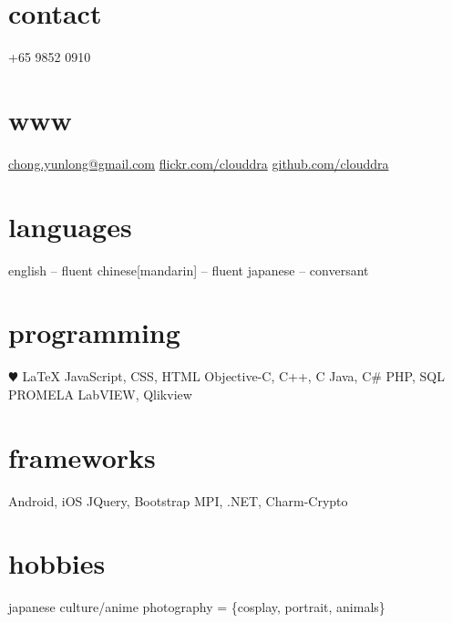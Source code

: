 \documentclass{friggeri-cv} %
\begin{document}


\begin{aside} %
\section{contact}
+65 9852 0910
~
\section{www}
\href{mailto:chong.yunlong@gmail.com}{chong.yunlong@gmail.com}
\href{https://secure.flickr.com/photos/clouddra/}{flickr.com/clouddra}
\href{https://github.com/clouddra}{github.com/clouddra}
~
\section{languages}
english -- fluent
chinese[mandarin] -- fluent
japanese -- conversant
~
\section{programming}
{\color{red} $\varheartsuit$} \LaTeX{}
JavaScript, CSS, HTML
Objective-C, C++, C 
Java, C\#
PHP, SQL
PROMELA 
LabVIEW, Qlikview
~
\section{frameworks}
Android, iOS
JQuery, Bootstrap
MPI, .NET, Charm-Crypto
~
\section{hobbies}
japanese culture/anime
photography = 
\{cosplay, portrait, animals\}
\end{aside}

\end{document}
